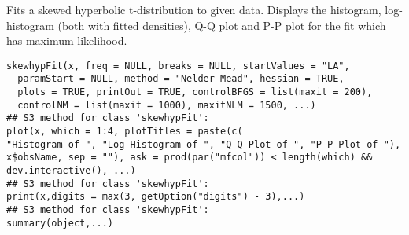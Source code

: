 \begin{Description}\relax
Fits a skewed hyperbolic t-distribution to given data.
Displays the histogram, log-histogram (both with fitted densities),
Q-Q plot and P-P plot for the fit which has maximum likelihood.
\end{Description}
\begin{Usage}
\begin{verbatim}
skewhypFit(x, freq = NULL, breaks = NULL, startValues = "LA",
  paramStart = NULL, method = "Nelder-Mead", hessian = TRUE,
  plots = TRUE, printOut = TRUE, controlBFGS = list(maxit = 200),
  controlNM = list(maxit = 1000), maxitNLM = 1500, ...)
## S3 method for class 'skewhypFit':
plot(x, which = 1:4, plotTitles = paste(c(
"Histogram of ", "Log-Histogram of ", "Q-Q Plot of ", "P-P Plot of "),
x$obsName, sep = ""), ask = prod(par("mfcol")) < length(which) &&
dev.interactive(), ...)
## S3 method for class 'skewhypFit':
print(x,digits = max(3, getOption("digits") - 3),...)
## S3 method for class 'skewhypFit':
summary(object,...)
\end{verbatim}
\end{Usage}
